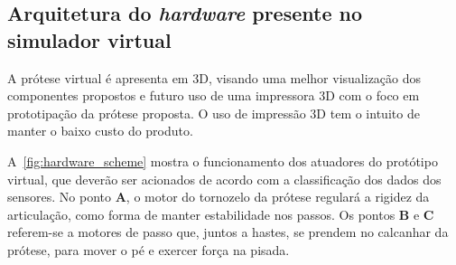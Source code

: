 % 

\subsection{Arquitetura do \textit{hardware} presente no simulador virtual}\label{sec:metodo_prot_hardware}

A prótese virtual é apresenta em 3D, visando uma melhor visualização dos componentes propostos e futuro uso de uma impressora 3D com o foco em prototipação da prótese proposta. O uso de impressão 3D tem o intuito de manter o baixo custo do produto.

A~\autoref{fig:hardware_scheme} mostra o funcionamento dos atuadores do protótipo virtual, que deverão ser acionados de acordo com a classificação dos dados dos sensores. No ponto \textbf{A}, o motor do tornozelo da prótese regulará a rigidez da articulação, como forma de manter estabilidade nos passos. Os pontos \textbf{B} e \textbf{C} referem-se a motores de passo que, juntos a hastes, se prendem no calcanhar da prótese, para mover o pé e exercer força na pisada.

